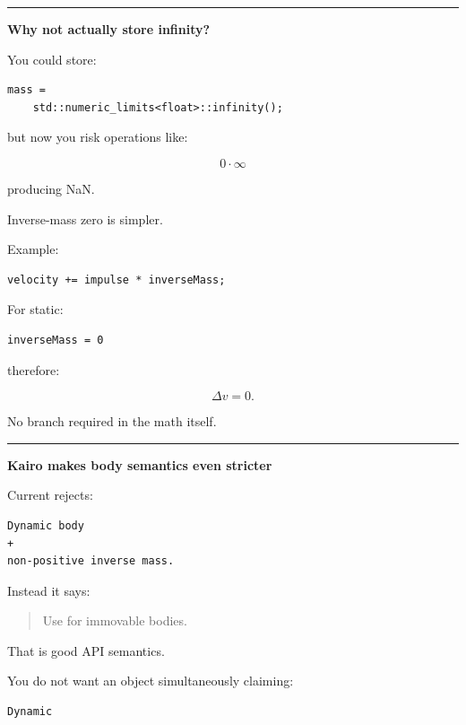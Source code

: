 \begin{center}\rule{0.5\linewidth}{0.5pt}\end{center}

\textbf{Why not actually store infinity?}

You could store:

\begin{verbatim}
mass =
    std::numeric_limits<float>::infinity();
\end{verbatim}

but now you risk operations like:

\[
0\cdot\infty
\]

producing NaN.

Inverse-mass zero is simpler.

Example:

\begin{verbatim}
velocity += impulse * inverseMass;
\end{verbatim}

For static:

\begin{verbatim}
inverseMass = 0
\end{verbatim}

therefore:

\[
\Delta v=0.
\]

No branch required in the math itself.

\begin{center}\rule{0.5\linewidth}{0.5pt}\end{center}

\textbf{Kairo makes body semantics even stricter}

Current  rejects:

\begin{verbatim}
Dynamic body
+
non-positive inverse mass.
\end{verbatim}

Instead it says:

\begin{quote}
Use  for immovable bodies.
\end{quote}

That is good API semantics.

You do not want an object simultaneously claiming:

\begin{verbatim}
Dynamic
\end{verbatim}

